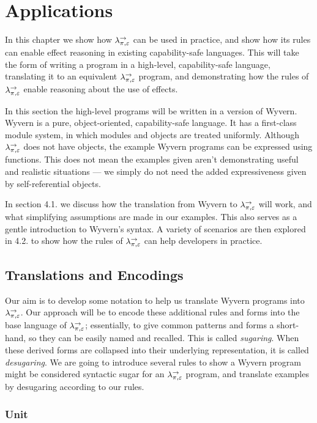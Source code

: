 
\chapter{Applications}

In this chapter we show how $\lambda^{\rightarrow}_{\pi, \varepsilon}$ can be used in practice, and show how its rules can enable effect reasoning in existing capability-safe languages. This will take the form of writing a program in a high-level, capability-safe language, translating it to an equivalent $\lambda^{\rightarrow}_{\pi, \varepsilon}$ program, and demonstrating how the rules of $\lambda^{\rightarrow}_{\pi, \varepsilon}$ enable reasoning about the use of effects.

In this section the high-level programs will be written in a version of Wyvern. Wyvern is a pure, object-oriented, capability-safe language. It has a first-class module system, in which modules and objects are treated uniformly. Although $\lambda^{\rightarrow}_{\pi, \varepsilon}$ does not have objects, the example Wyvern programs can be expressed using functions. This does not mean the examples given aren't demonstrating useful and realistic situations --- we simply do not need the added expressiveness given by self-referential objects.

In section 4.1. we discuss how the translation from Wyvern to $\lambda^{\rightarrow}_{\pi, \varepsilon}$ will work, and what simplifying assumptions are made in our examples. This also serves as a gentle introduction to Wyvern's syntax. A variety of scenarios are then explored in 4.2. to show how the rules of $\lambda^{\rightarrow}_{\pi, \varepsilon}$ can help developers in practice.

\section{Translations and Encodings}

Our aim is to develop some notation to help us translate Wyvern programs into $\lambda^{\rightarrow}_{\pi, \varepsilon}$. Our approach will be to encode these additional rules and forms into the base language of $\lambda^{\rightarrow}_{\pi, \varepsilon}$; essentially, to give common patterns and forms a short-hand, so they can be easily named and recalled. This is called \textit{sugaring}. When these derived forms are collapsed into their underlying representation, it is called \textit{desugaring}. We are going to introduce several rules to show a Wyvern program might be considered syntactic sugar for an $\lambda^{\rightarrow}_{\pi, \varepsilon}$ program, and translate examples by desugaring according to our rules.

\subsection{Unit}

